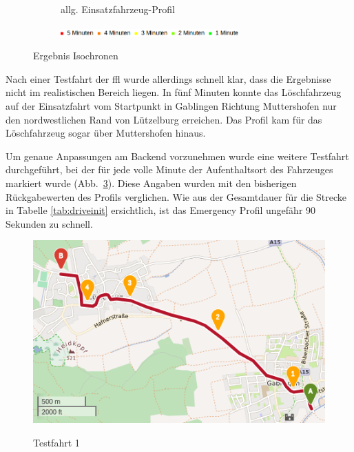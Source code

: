 \begin{figure}[htb]
\begin{subfigure}{0.49\textwidth}
\caption{allg. Einsatzfahrzeug-Profil}
\label{fig:isoeme}
\end{subfigure}
\begin{subfigure}{0.90\textwidth}
\centering
\includegraphics[width = 0.75\textwidth]{../media/legendiso.png} \\
\end{subfigure}
\caption{Ergebnis Isochronen}
\label{fig:isochrones}
\end{figure}

Nach einer Testfahrt der \gls{ffl} wurde allerdings schnell klar, dass die Ergebnisse nicht im realistischen Bereich liegen.
In fünf Minuten konnte das Löschfahrzeug auf der Einsatzfahrt vom Startpunkt in Gablingen Richtung Muttershofen nur den nordwestlichen Rand von Lützelburg erreichen.
Das Profil kam für das Löschfahrzeug sogar über Muttershofen hinaus.


Um genaue Anpassungen am Backend vorzunehmen wurde eine weitere Testfahrt durchgeführt, bei der für jede volle Minute der Aufenthaltsort des Fahrzeuges markiert wurde (Abb.~\ref{fig:drive1}).
Diese Angaben wurden mit den bisherigen Rückgabewerten des Profils verglichen.
Wie aus der Gesamtdauer für die Strecke in Tabelle \ref{tab:driveinit} ersichtlich, ist das Emergency Profil ungefähr 90 Sekunden zu schnell.

\begin{figure}[htb]
\centering
\includegraphics[width = 0.7 \textwidth]{../media/Fahrt1.png} \\
\caption{Testfahrt 1}
\label{fig:drive1}
\end{figure}

